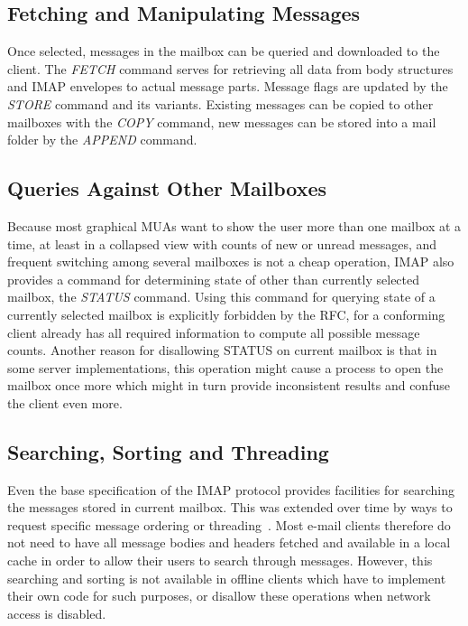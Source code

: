\documentclass[12pt,notitlepage]{report}
\begin{document}
\subsection{Fetching and Manipulating Messages}

Once selected, messages in the mailbox can be queried and downloaded to the
client.  The {\em FETCH} command serves for retrieving all data from body
structures and IMAP envelopes to actual message parts.  Message flags are
updated by the {\em STORE} command and its variants.  Existing messages can be
copied to other mailboxes with the {\em COPY} command, new messages can be
stored into a mail folder by the {\em APPEND} command.

\subsection{Queries Against Other Mailboxes}

Because most graphical MUAs want to show the user more than one mailbox at a
time, at least in a collapsed view with counts of new or unread messages, and
frequent switching among several mailboxes is not a cheap operation, IMAP also
provides a command for determining state of other than currently selected mailbox,
the {\em STATUS} command.  Using this command for querying state of a currently
selected mailbox is explicitly forbidden by the RFC, for a conforming client
already has all required information to compute all possible message counts.
Another reason for disallowing STATUS on current mailbox is that in some server
implementations, this operation might cause a process to open the mailbox once
more which might in turn provide inconsistent results and confuse the client
even more.

\subsection{Searching, Sorting and Threading}

Even the base specification of the IMAP protocol provides facilities for
searching the messages stored in current mailbox.  This was extended over time
by ways to request specific message ordering or threading~\cite{rfc-threading}.
Most e-mail clients therefore do not need to have all message bodies and headers
fetched and available in a local cache in order to allow their users to search
through messages.  However, this searching and sorting is not available in
offline clients which have to implement their own code for such purposes, or
disallow these operations when network access is disabled.
\end{document}
